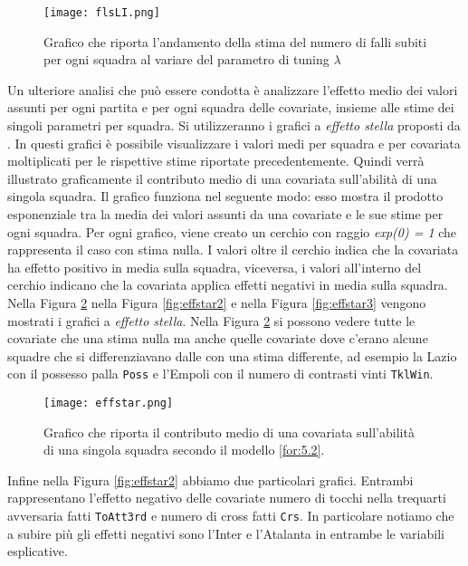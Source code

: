 \begin{figure}[htbp]
	\begin{center}
		\texttt{[image: flsLI.png]}
		\caption{Grafico che riporta l'andamento della stima del numero di falli subiti per ogni squadra al variare del parametro di tuning $\lambda$} \label{fig:flsLI}
	\end{center}
\end{figure}
\pagebreak
Un ulteriore analisi che può essere condotta è analizzare l'effetto medio dei valori assunti per ogni partita e per ogni squadra delle covariate, insieme alle stime dei singoli parametri per squadra. Si utilizzeranno i grafici a \emph{effetto stella} proposti da \textcite{tutz2013visualization}. In questi grafici è possibile visualizzare i valori medi per squadra e per covariata moltiplicati per le rispettive stime riportate precedentemente. Quindi verrà illustrato graficamente il contributo medio di una covariata sull'abilità di una singola squadra. Il grafico funziona nel seguente modo: esso mostra il prodotto esponenziale tra la media dei valori assunti da una covariate e le sue stime per ogni squadra. Per ogni grafico, viene creato un cerchio con raggio \emph{exp(0) = 1} che rappresenta il caso con stima nulla. I valori oltre il cerchio indica che la covariata ha effetto positivo in media sulla squadra, viceversa, i valori all'interno del cerchio indicano che la covariata applica effetti negativi in media sulla squadra. Nella Figura \ref{fig:effstar1} nella Figura \ref{fig:effstar2} e  nella Figura \ref{fig:effstar3} vengono mostrati i grafici a \emph{effetto stella}.
Nella Figura \ref{fig:effstar1} si possono vedere tutte le covariate che una stima nulla ma anche quelle covariate dove c'erano alcune squadre che si differenziavano dalle con una stima differente, ad esempio la Lazio con il possesso palla \texttt{Poss} e l'Empoli con il numero di contrasti vinti \texttt{TklWin}.\\

\begin{figure}[htbp]
	\begin{center}
		\texttt{[image: effstar.png]}
		\caption{Grafico che riporta il contributo medio di una covariata sull'abilità di una singola squadra secondo il modello \ref{for:5.2}.} \label{fig:effstar1}
	\end{center}
\end{figure}

Infine nella Figura \ref{fig:effstar2} abbiamo due particolari grafici. Entrambi rappresentano l'effetto negativo delle covariate numero di tocchi nella trequarti avversaria fatti \texttt{ToAtt3rd} e numero di cross fatti \texttt{Crs}. In particolare notiamo che a subire più gli effetti negativi sono l'Inter e l'Atalanta in entrambe le variabili esplicative. 


